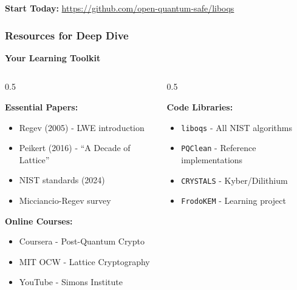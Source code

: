 \documentclass[aspectratio=169,10pt]{beamer}
\newcommand{\teaching}[1]{}
\newcommand{\slideheader}[1]{\frametitle{#1}}
\theoremstyle{plain}
\begin{document}
\begin{frame}
  \vspace{0.5cm}
  
  \begin{greenBox}
    \textbf{Start Today:}
    \url{https://github.com/open-quantum-safe/liboqs}
  \end{greenBox}
  
  \teaching{Concrete actionable steps}
\end{frame}

\begin{frame}
  \slideheader{Resources for Deep Dive}
  
  \begin{center}
    \textbf{\large Your Learning Toolkit}
  \end{center}
  
  \vspace{0.5cm}
  
  \begin{columns}[T]
    \begin{column}{0.5\textwidth}

    \textbf{Essential Papers:}
    \begin{itemize}
      \item Regev (2005) - LWE introduction
      \item Peikert (2016) - ``A Decade of Lattice''
      \item NIST standards (2024)
      \item Micciancio-Regev survey
    \end{itemize}
    
    \vspace{0.3cm}
    
    \textbf{Online Courses:}
    \begin{itemize}
      \item Coursera - Post-Quantum Crypto
      \item MIT OCW - Lattice Cryptography
      \item YouTube - Simons Institute
    \end{itemize}
  
    \end{column}
    \begin{column}{0.5\textwidth}

    \textbf{Code Libraries:}
    \begin{itemize}
      \item \texttt{liboqs} - All NIST algorithms
      \item \texttt{PQClean} - Reference implementations
      \item \texttt{CRYSTALS} - Kyber/Dilithium
      \item \texttt{FrodoKEM} - Learning project
    \end{itemize}
    

\end{column}
\end{columns}
\end{frame}
\end{document}
